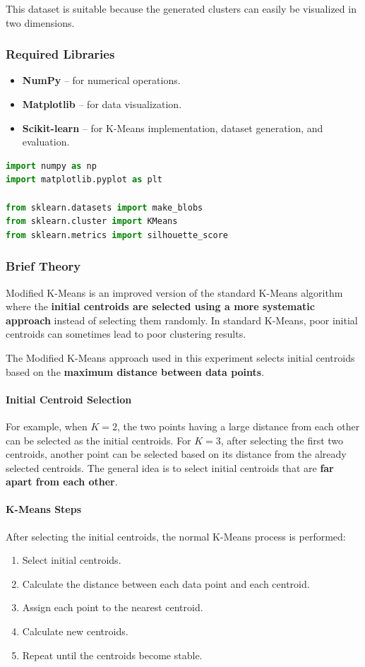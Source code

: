 \documentclass[a4paper,11pt]{article}
\begin{document}
This dataset is suitable because the generated clusters can easily be visualized in two dimensions.

\subsubsection{Required Libraries}
\begin{itemize}
    \item \textbf{NumPy} -- for numerical operations.
    \item \textbf{Matplotlib} -- for data visualization.
    \item \textbf{Scikit-learn} -- for K-Means implementation, dataset generation, and evaluation.
\end{itemize}

\begin{lstlisting}[language=Python, caption={Required Imports}]
import numpy as np
import matplotlib.pyplot as plt

from sklearn.datasets import make_blobs
from sklearn.cluster import KMeans
from sklearn.metrics import silhouette_score
\end{lstlisting}

\subsubsection{Brief Theory}
Modified K-Means is an improved version of the standard K-Means algorithm where the \textbf{initial centroids are selected using a more systematic approach} instead of selecting them randomly. In standard K-Means, poor initial centroids can sometimes lead to poor clustering results.

The Modified K-Means approach used in this experiment selects initial centroids based on the \textbf{maximum distance between data points}.

\paragraph{Initial Centroid Selection}
For example, when $K = 2$, the two points having a large distance from each other can be selected as the initial centroids. For $K = 3$, after selecting the first two centroids, another point can be selected based on its distance from the already selected centroids. The general idea is to select initial centroids that are \textbf{far apart from each other}.

\paragraph{K-Means Steps}
After selecting the initial centroids, the normal K-Means process is performed:
\begin{enumerate}
    \item Select initial centroids.
    \item Calculate the distance between each data point and each centroid.
    \item Assign each point to the nearest centroid.
    \item Calculate new centroids.
    \item Repeat until the centroids become stable.
\end{enumerate}
\end{document}
